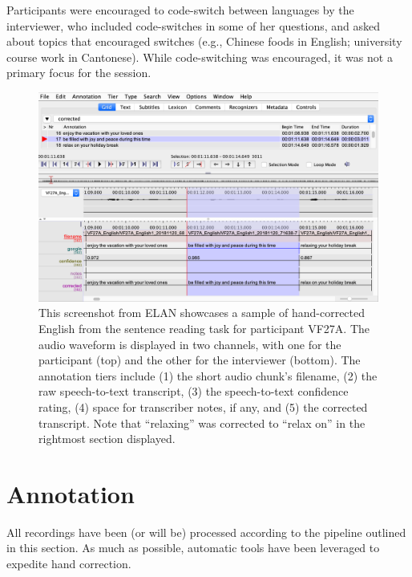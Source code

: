Participants were encouraged to code-switch between languages by the interviewer, who included code-switches in some of her questions, and asked about topics that encouraged switches (e.g., Chinese foods in English; university course work in Cantonese). While code-switching was encouraged, it was not a primary focus for the session.

\begin{figure}[ht]
\begin{center}
\includegraphics[width=\textwidth]{figures/2-elan_screenshot.png} 
\caption{This screenshot from ELAN showcases a sample of hand-corrected English from the sentence reading task for participant VF27A. The audio waveform is displayed in two channels, with one for the participant (top) and the other for the interviewer (bottom). The annotation tiers include (1) the short audio chunk's filename, (2) the raw speech-to-text transcript, (3) the speech-to-text confidence rating, (4) space for transcriber notes, if any, and (5) the corrected transcript. Note that ``relaxing'' was corrected to ``relax on'' in the rightmost section displayed.}
\label{ch2:fig:elan}
\end{center}
\end{figure}

\section{Annotation}\label{ch2:sec:annotation}
All recordings have been (or will be) processed according to the pipeline outlined in this section. As much as possible, automatic tools have been leveraged to expedite hand correction. 

